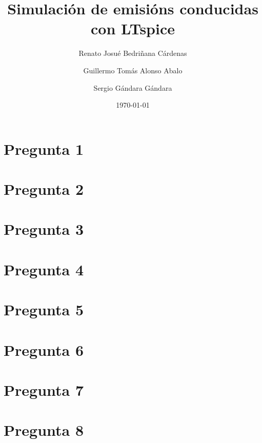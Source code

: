 \documentclass[11pt,a4paper]{article}
\title{\vspace{-1.5cm}\Large\textbf{Simulación de emisións conducidas con LTspice}}
\author{\normalsize Renato Josué Bedriñana Cárdenas \and \normalsize Guillermo Tomás Alonso Abalo \and \normalsize Sergio Gándara Gándara}
\date{\normalsize\today}
\begin{document}
\maketitle
\vspace{0.5cm}
\section{Pregunta 1}


\vspace{0.5cm}
\section{Pregunta 2}


\vspace{0.5cm}
\section{Pregunta 3}

\vspace{0.5cm}
\section{Pregunta 4}


\vspace{0.5cm}
\section{Pregunta 5}


\vspace{0.5cm}
\section{Pregunta 6}


\vspace{0.5cm}
\section{Pregunta 7}


\vspace{0.5cm}
\section{Pregunta 8}


\newpage
%
\end{document}
